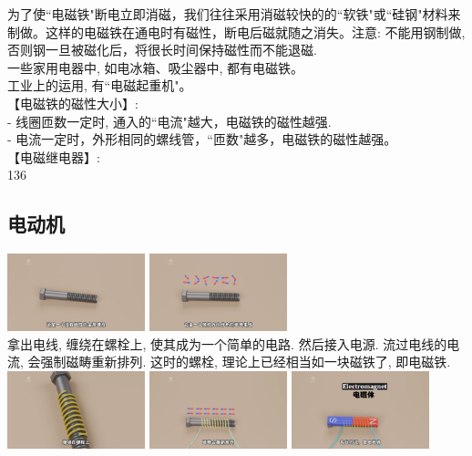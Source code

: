 \documentclass[UTF8]{ctexart}
\begin{document}
	为了使``电磁铁"断电立即消磁，我们往往采用消磁较快的的``软铁"或``硅钢"材料来制做。这样的电磁铁在通电时有磁性，断电后磁就随之消失。注意: 不能用钢制做, 否则钢一旦被磁化后，将很长时间保持磁性而不能退磁. \\	
	
	一些家用电器中, 如电冰箱、吸尘器中, 都有电磁铁。\\
	工业上的运用, 有``电磁起重机"。\\
	
	
	【电磁铁的磁性大小】:\\
	- 线圈匝数一定时, 通入的``电流"越大，电磁铁的磁性越强. \\
	- 电流一定时，外形相同的螺线管，``匝数"越多，电磁铁的磁性越强。 \\
	
	
	【电磁继电器】:\\
	
	136
	
	\vspace{1em} 
	
	
	\subsection{电动机}
	
	\includegraphics[width=0.3\textwidth]{img/0089.png}
	\includegraphics[width=0.3\textwidth]{img/0090.png}\\
	拿出电线, 缠绕在螺栓上, 使其成为一个简单的电路. 然后接入电源. 流过电线的电流, 会强制磁畴重新排列. 这时的螺栓, 理论上已经相当如一块磁铁了, 即电磁铁. \\
	\includegraphics[width=0.3\textwidth]{img/0091.png}	
	\includegraphics[width=0.3\textwidth]{img/0092.png}	
	\includegraphics[width=0.3\textwidth]{img/0093.png}	
	
\end{document}

